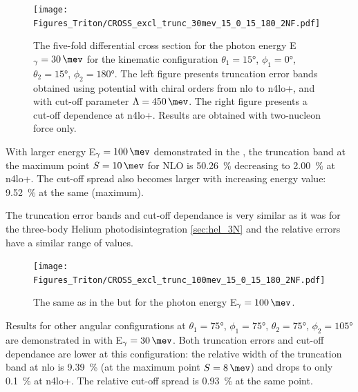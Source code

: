     \begin{figure}[h]
        \begin{center}
            \texttt{[image: Figures\_Triton/CROSS\_excl\_trunc\_30mev\_15\_0\_15\_180\_2NF.pdf]}
            \end{center}
            \caption{The five-fold differential cross section for the photon 
            energy E$_\gamma=\SI{30}{\mev}$ for the kinematic configuration
            $\theta_1 = \ang{15}$, $\phi_1 = \ang{0}$,
            $\theta_2 = \ang{15}$, $\phi_2 = \ang{180}$.
            The left figure presents truncation error bands obtained using potential
            with chiral orders from \gls{nlo} to \gls{n4lo+}, and with
            cut-off parameter $\Lambda=\SI{450}{\mev}$.
            The right figure presents a cut-off dependence at \gls{n4lo+}.
            Results are obtained with two-nucleon force only.}
            \label{CROSS_Triton_EXCL_30_15_0_15_180}
    \end{figure}

    With larger energy E$_\gamma=\SI{100}{\mev}$ demonstrated in the ,
    the truncation band at the maximum point $S=\SI{10}{\mev}$ for NLO is \SI{50.26}{\percent}
    decreasing to \SI{2.00}{\percent} at \gls{n4lo+}.
    The cut-off spread also becomes larger with increasing energy value: \SI{9.52}{\percent}
    at the same (maximum).

    The truncation error bands and cut-off dependance is very similar as it was for
    the three-body Helium photodisintegration \ref{sec:hel_3N} and the relative errors 
    have a similar range of values.

    \begin{figure}[h]
        \begin{center}
            \texttt{[image: Figures\_Triton/CROSS\_excl\_trunc\_100mev\_15\_0\_15\_180\_2NF.pdf]}
            \end{center}
            \caption{The same as in the  but for the photon energy
            E$_\gamma = \SI{100}{\mev}$.}
            \label{CROSS_Triton_EXCL_100mev_15_0_15_180}
    \end{figure}



    Results for other angular configurations at 
    $\theta_1 = \ang{75}$, $\phi_1 = \ang{75}$,
    $\theta_2 = \ang{75}$, $\phi_2 = \ang{105}$ are
    demonstrated in  with E$_\gamma=\SI{30}{\mev}$.
    Both truncation errors and cut-off dependance are lower at this configuration:
    the relative  width of the truncation band at \gls{nlo} is \SI{9.39}{\percent}
    (at the maximum point $S=\SI{8}{\mev}$) and drops to only \SI{0.1}{\percent}
    at \gls{n4lo+}. The relative cut-off spread is \SI{0.93}{\percent} at the same point.

